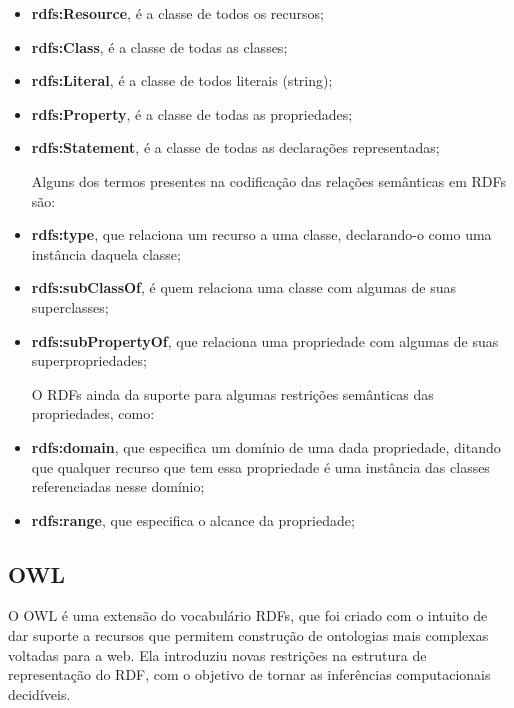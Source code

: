 \begin{itemize}
    \item \textbf{rdfs:Resource}, é a classe de todos os recursos;
    
    \item \textbf{rdfs:Class}, é a classe de todas as classes;
    
    \item \textbf{rdfs:Literal}, é a classe de todos literais (string);
    
    \item \textbf{rdfs:Property}, é a classe de todas as propriedades;
    
    \item \textbf{rdfs:Statement}, é a classe de todas as declarações 
    representadas;
    
    Alguns dos termos presentes na codificação das relações semânticas em RDFs 
    são:
    
    \item \textbf{rdfs:type}, que relaciona um recurso a uma classe, declarando-o
    como uma instância daquela classe;
    
    \item \textbf{rdfs:subClassOf}, é quem relaciona uma classe com algumas de 
    suas superclasses;
    
    \item \textbf{rdfs:subPropertyOf}, que relaciona uma propriedade com algumas
    de suas superpropriedades;
    
    O RDFs ainda da suporte para algumas restrições semânticas das propriedades,
    como:
    
    \item \textbf{rdfs:domain}, que especifica um domínio de uma dada propriedade,
    ditando que qualquer recurso que tem essa propriedade é uma instância das 
    classes referenciadas nesse domínio;
    
    \item \textbf{rdfs:range}, que especifica o alcance da propriedade;
\end{itemize}


\subsection{OWL}
\label{sec:owl}

O OWL é uma extensão do vocabulário RDFs, que foi criado com o intuito de dar 
suporte a recursos que permitem construção de ontologias mais complexas voltadas
para a web. Ela introduziu novas restrições na estrutura de representação do RDF,
com o objetivo de tornar as inferências computacionais decidíveis.

